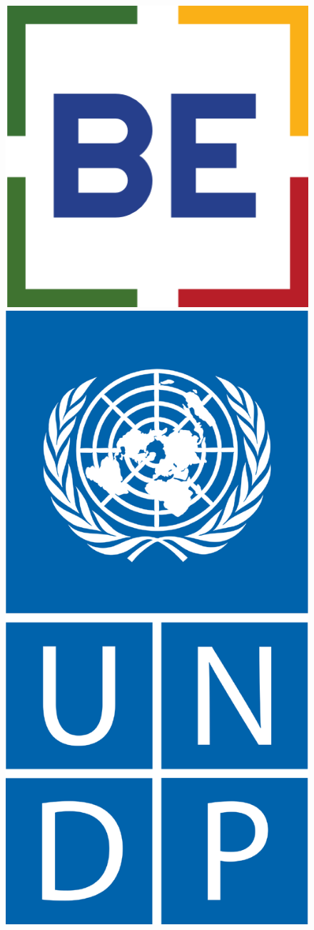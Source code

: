 \documentclass[12pt,a4paper]{article}
\begin{document}
  
  {
   \setlength{\topmargin}{-2cm}
   \enlargethispage{30mm}
\begin{titlepage}
  \begin{center}
    
	\begin{figure}[h]
    \centering
    \begin{minipage}{.45\textwidth}
    \centering
    \includegraphics[width=.7\linewidth]{../figures/logoBE.png}
    \end{minipage}%
    \begin{minipage}{.45\textwidth}
    \centering
    \includegraphics[height=.7\linewidth]{../figures/UNDP-LOGO.pdf}
    \end{minipage}
    \end{figure}    
    
    
   \vspace{0.5cm}


\end{center}
\end{titlepage}}
\end{document}
